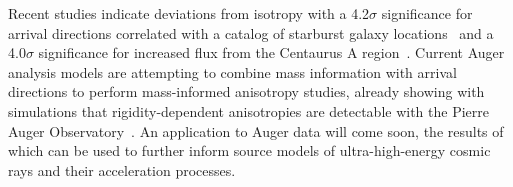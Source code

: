 Recent studies indicate deviations from isotropy with a 4.2$\sigma$ significance for arrival directions correlated with a catalog of starburst galaxy locations~\cite{icrc2025_anisotropy} and a 4.0$\sigma$ significance for increased flux from the Centaurus A region~\cite{icrc2023_geraldina_anisotropy}.
Current Auger analysis models are attempting to combine mass information with arrival directions to perform mass-informed anisotropy studies, already showing with simulations that rigidity-dependent anisotropies are detectable with the Pierre Auger Observatory~\cite{uhecr2024_lorenzo, uhecr2024_emily, icrc2025_geraldina_anisotropy}.
An application to Auger data will come soon, the results of which can be used to further inform source models of ultra-high-energy cosmic rays and their acceleration processes.










